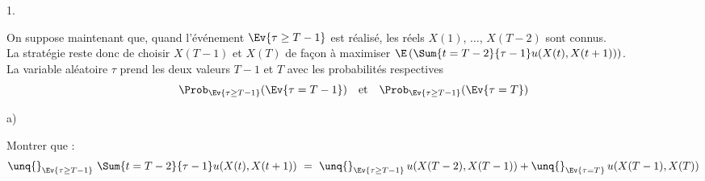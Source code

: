 \begin{noliste}{1.}
  \item On suppose maintenant que, quand l'événement $\Ev{\tau \geq 
  T-1}$ est réalisé, les réels $X(1)$, $\ldots$, $X(T-2)$ sont connus. 
  \\[.1cm]
  La 
  stratégie reste donc de choisir $X(T-1)$ et $X(T)$ de façon à 
  maximiser $\E\left(\Sum{t=T-2}{\tau-1} u(X(t), 
  X(t+1))\right)$.\\[.1cm]
  La variable aléatoire $\tau$ prend les deux valeurs $T-1$ et $T$ 
  avec les probabilités respectives 
  \[
    \Prob_{\Ev{\tau \geq T-1}}(\Ev{\tau = T-1}) \quad \text{et} 
    \quad \Prob_{\Ev{\tau \geq T-1}}(\Ev{\tau = T})
  \]
  \end{noliste}
  
  
  \newpage
  
  
  \begin{noliste}{a)}
    \setlength{\itemsep}{2mm}
    \item Montrer que :
    \[
      \unq{}_{\Ev{\tau \geq T-1}} \ \Sum{t=T-2}{\tau-1} 
      u(X(t),X(t+1))
      \ = \ \unq{}_{\Ev{\tau \geq T-1}} \, u(X(T-2),X(T-1)) + 
      \unq{}_{\Ev{\tau = T}} \, u(X(T-1),X(T))
    \]
    

\end{noliste}
